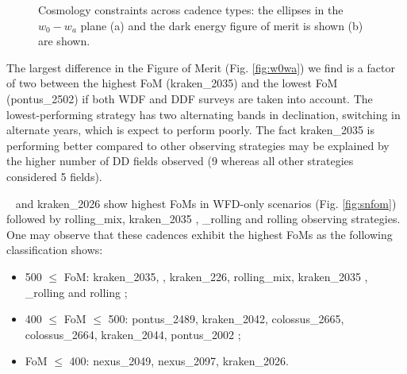 \begin{figure}
  \begin{center}
    \caption{Cosmology constraints across cadence types: the ellipses in the $w_0-w_a$ plane (a) and the dark energy figure of merit is shown (b) are shown. }
    \end{center}
\end{figure}
The largest difference in the Figure of Merit (Fig. \ref{fig:w0wa}) we find is a factor of two between the highest FoM (kraken\_2035) and the lowest FoM (pontus\_2502) if both WDF and DDF surveys are taken into account. The lowest-performing strategy has two alternating bands in declination, switching in alternate years, which is expect to perform poorly. The fact kraken\_2035 is performing better compared to other observing strategies may be explained by the higher number of DD fields observed (9 whereas all other strategies considered 5 fields).

\altsched~ and kraken\_2026 show highest FoMs in WFD-only scenarios (Fig. \ref{fig:snfom}) followed by rolling\_mix, kraken\_2035 , \altsched\_rolling and rolling observing strategies. One may observe that these cadences exhibit the highest FoMs as the following classification shows:
\begin{itemize}
\item{500 $\leq$ FoM}: kraken\_2035, \altsched, kraken\_226, rolling\_mix, kraken\_2035 , \altsched\_rolling and rolling ;
\item{400 $\leq$ FoM $\leq$ 500}: pontus\_2489, kraken\_2042, colossus\_2665, colossus\_2664, kraken\_2044, pontus\_2002 ;
\item{FoM $\leq$ 400}: nexus\_2049, nexus\_2097, kraken\_2026.

\end{itemize}





